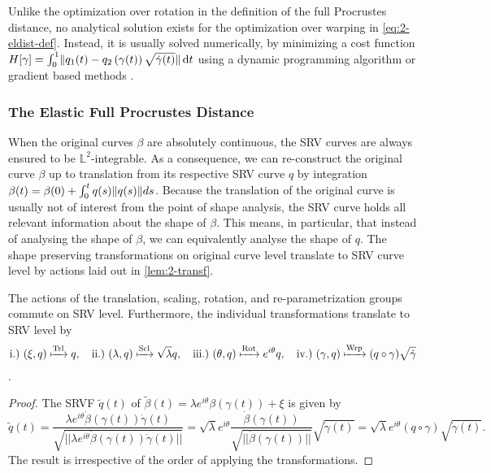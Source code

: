 \noindent Unlike the optimization over rotation in the definition of the full Procrustes distance, no analytical solution exists for the optimization over warping in \cref{eq:2-eldist-def}.
Instead, it is usually solved numerically, by minimizing a cost function $H[\gamma] = \int_0^1 \lVert q_1(t) - q_2\left( \gamma(t) \right) \sqrt{\dot\gamma(t)}\rVert \mathop{\mathrm{d}t}$ using a dynamic programming algorithm \parencite[see e.g.][152]{SrivastavaKlassen2016} or gradient based methods \parencite[see e.g.][]{Steyer2021}.


\subsubsection*{The Elastic Full Procrustes Distance}
When the original curves $\beta$ are absolutely continuous, the SRV curves are always ensured to be $\mathbb{L}^2$-integrable.
As a consequence, we can re-construct the original curve $\beta$ up to translation from its respective SRV curve $q$ by integration $\beta(t) = \beta(0) + \int_0^t q(s) \lVert q(s)\rVert ds$.
Because the translation of the original curve is usually not of interest from the point of shape analysis, the SRV curve holds all relevant information about the shape of $\beta$.
This means, in particular, that instead of analysing the shape of $\beta$, we can equivalently analyse the shape of $q$.
The shape preserving transformations on original curve level translate to SRV curve level by actions laid out in \cref{lem:2-transf}.

\begin{lemma}
  \label{lem:2-transf}
  The actions of the translation, scaling, rotation, and re-parametrization groups commute on SRV level.
  Furthermore, the individual transformations translate to SRV level by 
  \begin{equation*}
    \text{i.)} \,\,(\xi, q) \xmapsto{\text{Trl}} q,\quad 
    \text{ii.)} \,\, (\lambda, q) \xmapsto{\text{Scl}} \sqrt\lambda q,\quad
    \text{iii.)} \,\, (\theta, q) \xmapsto{\text{Rot}} e^{i\theta} q,\quad
    \text{iv.)} \,\, (\gamma, q) \xmapsto{\text{Wrp}} (q \circ \gamma) \sqrt{\dot\gamma}
  \end{equation*}
  \parencite[see e.g.][142]{SrivastavaKlassen2016}.
\begin{proof} The SRVF $\widetilde q(t)$ of  $\widetilde\beta(t) = \lambda e^{i\theta}\beta\left(\gamma(t)\right) + \xi$ is given by
$$ \widetilde q (t) 
  = \frac{\lambda e^{i\theta} \dot\beta\left(\gamma(t)\right) \dot\gamma(t)}{\sqrt{||\lambda e^{i\theta} \dot\beta\left(\gamma(t)\right) \dot\gamma(t)||}} 
  = \sqrt{\lambda} e^{i\theta} \frac{\dot\beta\left(\gamma(t)\right)}{\sqrt{||\dot\beta\left(\gamma(t)\right)||}} \sqrt{\dot\gamma(t)} 
  = \sqrt\lambda e^{i\theta} \left( q \circ \gamma \right) \sqrt{\dot\gamma(t)}.$$
The result is irrespective of the order of applying the transformations.
\end{proof}
\end{lemma}

